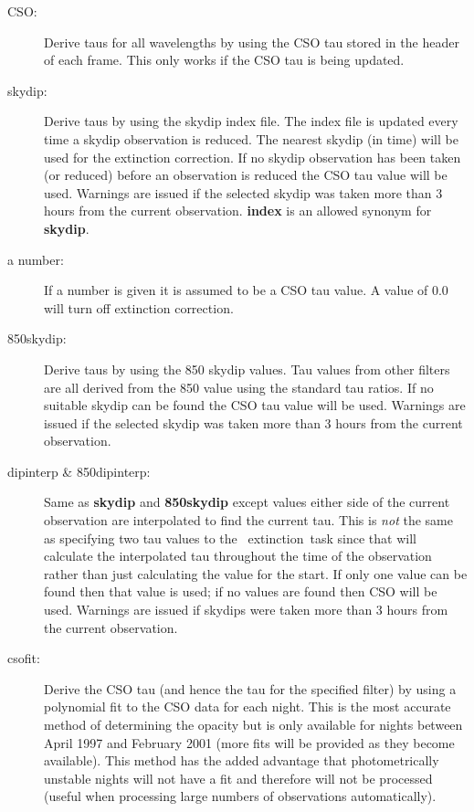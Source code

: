 \documentclass[twoside,11pt]{article}
\newcommand{\xref}[3]{#1}
\renewcommand{\_}{\texttt{\symbol{95}}}
\newcommand{\task}[1]{{\textsf{#1}}}
\newcommand{\SURF}{\xref{{\sc{Surf}}}{sun216}{}}
\newcommand{\extinction}{\xref{\task{extinction}}{sun216}{EXTINCTION}}
\begin{document}
\begin{itemize}
\begin{description}
\item[CSO:] Derive taus for all wavelengths by using the CSO tau stored in the 
header of each frame. This only works if the CSO tau is being updated.
\item[skydip:] Derive taus by using the skydip index file. The index file
is updated every time a skydip observation is reduced. The nearest skydip (in
time) will be used for the extinction correction. 
If no skydip observation has been taken (or reduced) before an observation
is reduced the CSO tau value will be used. Warnings are issued if the
selected skydip was taken more than 3 hours from the current
observation. 
\textbf{index} is an allowed synonym for \textbf{skydip}.
\item[a number:] If a number is given it is assumed to be a CSO tau value.
A value of 0.0 will turn off extinction correction.
\item[850skydip:] Derive taus by using the 850 skydip values. Tau values
from other filters are all derived from the 850 value using the standard
tau ratios. If no suitable skydip can be found the CSO tau value will be
used. Warnings are issued if the
selected skydip was taken more than 3 hours from the current
observation. 
\item[dipinterp \& 850dipinterp:] Same as \textbf{skydip} and
\textbf{850skydip} except values either side of the current observation
are interpolated to find the current tau. This is \emph{not} the same as
specifying two tau values to the \SURF\ \extinction\ task since that
will calculate the interpolated tau throughout the time of the observation
rather than just calculating the value for the start. If only one value can
be found then that value is used; if no values are found then CSO will
be used. Warnings are issued if skydips were taken more than 3 hours from
the current observation.
\item[csofit:] Derive the CSO tau (and hence the tau for the specified
filter) by using a polynomial fit to the CSO data for each night. This is the
most accurate method of determining the opacity but is only available
for nights between April 1997 and February 2001 (more fits will be provided
as they become available). This method has the added advantage that
photometrically unstable nights will not have a fit and therefore will
not be processed (useful when processing large numbers of observations
automatically).
\end{description}


\end{itemize}
\end{document}
